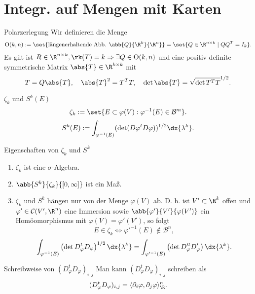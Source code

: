 \section*{Integr. auf Mengen mit Karten}

\begin{karte}{Polarzerlegung}
    Wir definieren die Menge 
    \[ \mathrm{O}(k,n) := \set{\text{längenerhaltende Abb. } \abb{Q}{\R^k}{\R^n}}
    = \set{ Q \in \R^{n\times k} \;|\; QQ^T = I_k }. \]
    Es gilt ist \(R \in \R^{n\times k}, \rk(T) = k \Rightarrow 
    \exists Q\in\mathrm{O}(k,n) \) und eine positiv definite symmetrische Matrix 
    \( \abs{T} \in \R^{k\times k} \) mit 
    \[ T = Q\abs{T}, \quad \abs{T}^2 = T^T T, \quad \det \abs{T} = \sqrt{\det T^T T}^{1/2}. \]
\end{karte}

\begin{karte}{\( \zeta_k \) und \(S^k(E)\)}
    \[ \zeta_k := \set{ E \subset \varphi(V): \varphi^{-1}(E) \in \mathcal{B}^m }. \]
    \[ S^k(E) := \int_{\varphi^{-1}(E)} (\det(D\varphi^t D\varphi))^{1/2} \dx{\lambda^k}. \]
\end{karte}

\begin{karte}{Eigenschaften von \( \zeta_k \) und \(S^k\)}
    \begin{enumerate}
        \item \( \zeta_k \) ist eine \(\sigma\)-Algebra.
        \item \( \abb{S^k}{\zeta_k}{[0,\infty]} \) ist ein Maß.
        \item \( \zeta_k \) und \(S^k\) hängen nur von der Menge \( \varphi(V) \) ab. 
        D. h. ist \(V' \subset \R^k\) offen und \( \varphi'\in \mathcal{C}(V', \R^n) \) 
        eine Immersion sowie \( \abb{\varphi'}{V'}{\varphi(V')} \) 
        ein Homöomorphismus mit \(\varphi(V) = \varphi'(V')\), so folgt 
        \[ E \in \zeta_k \Leftrightarrow \varphi'^{-1}(E) \notin \mathcal{B}^n, \]
        \[ \int_{\varphi^{-1}(E)} \left(\det D^t_\varphi D_\varphi\right)^{1/2} \dx{\lambda^k} 
        = \int_{\varphi'^{-1}(E)} \left( \det D'^t_\varphi D'_\varphi \right) \dx{\lambda^k}. \]
    \end{enumerate}
\end{karte}

\begin{karte}{Schreibweise von \( (D^t_\varphi D_\varphi)_{i,j} \)}
    Man kann \( (D^t_\varphi D_\varphi)_{i,j} \) schreiben als 
    \[ (D^t_\varphi D_\varphi)_{i,j} = \langle \partial_i \varphi, \partial_j \varphi \rangle_\R^n. \]
\end{karte}